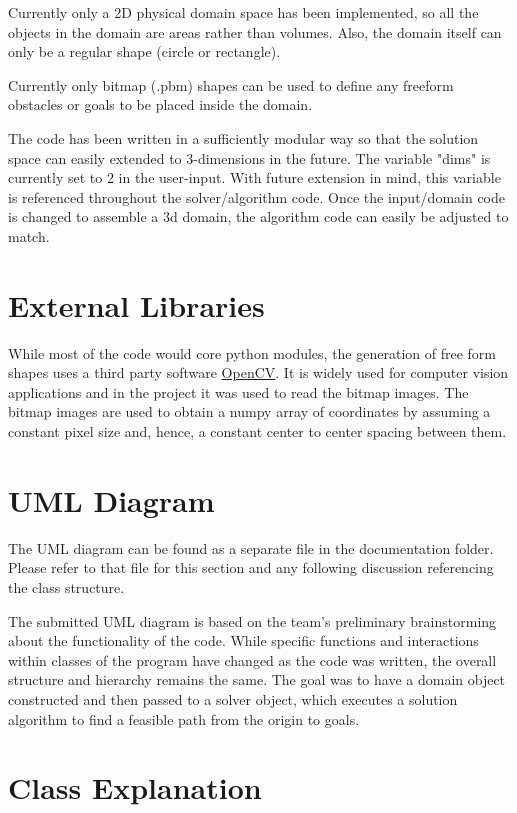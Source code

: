 \documentclass[10pt]{article}
\begin{document}
	Currently only a 2D physical domain space has been implemented, so all the objects in the domain are areas rather than volumes. Also, the domain itself can only be a regular shape (circle or rectangle).

	Currently only bitmap (.pbm) shapes can be used to define any freeform obstacles or goals to be placed inside the domain.
	
	The code has been written in a sufficiently modular way so that the solution space can easily extended to 3-dimensions in the future. The variable "dims" is currently set to 2 in the user-input. With future extension in mind, this variable is referenced throughout the solver/algorithm code. Once the input/domain code is changed to assemble a 3d domain, the algorithm code can easily be adjusted to match.

\section{External Libraries}
While most of the code would core python modules, the generation of free form shapes uses a third party software \href{https://opencv-python-tutroals.readthedocs.io/en/latest/py_tutorials/py_setup/py_intro/py_intro.html}{\ttfamily OpenCV}. It is widely used for computer vision applications and in the project it was used to read the bitmap images. The bitmap images are used to obtain a {\ttfamily numpy} array of coordinates by assuming a constant pixel size and, hence, a constant center to center spacing between them.
\newpage
\section{UML Diagram}
	The UML diagram can be found as a separate file in the documentation folder. Please refer to that file for this section and any following discussion referencing the class structure.

	The submitted UML diagram is based on the team's preliminary brainstorming about the functionality of the code. While specific functions and interactions within classes of the program have changed as the code was written, the overall structure and hierarchy remains the same. The goal was to have a domain object constructed and then passed to a solver object, which executes a solution algorithm to find a feasible path from the origin to goals.

\section{Class Explanation}
\end{document}
